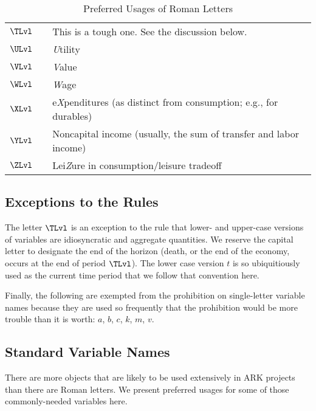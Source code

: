 \documentclass[12pt]{\econtex}
\begin{document}
\begin{table}[ht]
\begin{tabular}{|ccl|}
    \\ $ \TLvl$ & & This is a tough one.  See the discussion below.
    \\ $ \ULvl$ & & \textit{U}tility
    \\ $ \VLvl$ & & \textit{V}alue
    \\ $ \WLvl$ & & \textit{W}age
    \\ $ \XLvl$ & & e\textit{X}penditures (as distinct from consumption; e.g., for durables)
    \\ $ \YLvl$ & & Noncapital income (usually, the sum of transfer and labor income)
    \\ $ \ZLvl$ & & Lei\textit{Z}ure in consumption/leisure tradeoff
    \\ \hline 
  \end{tabular}
  \caption{Preferred Usages of Roman Letters}
  \label{table:RomanLetters}
\end{table}

\subsection{Exceptions to the Rules}

The letter $\TLvl$ is an exception to the rule that lower- and upper-case versions of variables are idiosyncratic and aggregate quantities.  We reserve the capital letter to designate the end of the horizon (death, or the end of the economy, occurs at the end of period $\TLvl$).  The lower case version $t$ is so ubiquitiously used as the current time period that we follow that convention here.

Finally, the following are exempted from the prohibition on single-letter variable names because they are used so frequently that the prohibition would be more trouble than it is worth: $a$, $b$, $c$, $k$, $m$, $v$.  

\pagebreak

\subsection{Standard Variable Names}

There are more objects that are likely to be used extensively in ARK projects than there are Roman letters.  We present preferred usages for some of those commonly-needed variables here.
\end{document}
